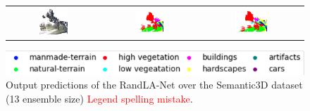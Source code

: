 \begin{figure}[h!]
\begin{tabular}{ccc}
            \includegraphics[width=0.33\textwidth, height=0.18\textheight]{images/seg_output/sem3d_seg_output/3_RGB.png} &
            \includegraphics[width=0.33\textwidth, height=0.18\textheight]{images/seg_output/sem3d_seg_output/3_GT.png}& 
            \includegraphics[width=0.33\textwidth, height=0.18\textheight]{images/seg_output/sem3d_seg_output/3_Pred.png}\\
        \end{tabular}
        \includegraphics[scale=0.65]{images/legend.png}
        \caption{Output predictions of the RandLA-Net over the Semantic3D dataset (13 ensemble size) \textcolor{red}{Legend spelling mistake}.}
    \end{figure}
